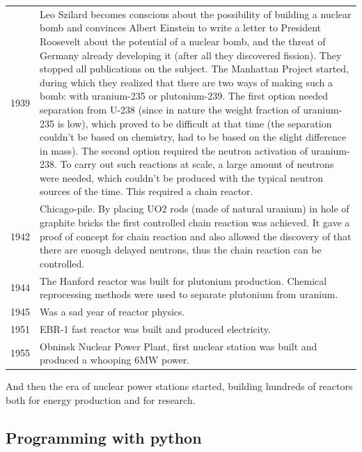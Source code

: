 \begin{tabularx}{\textwidth}{c | X}
1939 & Leo Szilard becomes conscious about the possibility of building a nuclear bomb and convinces Albert Einstein to write a letter to President Roosevelt about the potential of a nuclear bomb, and the threat of Germany already developing it (after all they discovered fission). They stopped all publications on the subject. The Manhattan Project started, during which they realized that there are two ways of making such a bomb: with uranium-235 or plutonium-239. The first option needed separation from U-238 (since in nature the weight fraction of uranium-235 is low), which proved to be difficult at that time (the separation couldn't be based on chemistry, had to be based on the slight difference in mass). The second option required the neutron activation of uranium-238. To carry out such reactions at scale, a large amount of neutrons were needed, which couldn't be produced with the typical neutron sources of the time. This required a chain reactor. \\
1942 & Chicago-pile. By placing UO2 rods (made of natural uranium) in hole of graphite bricks the first controlled chain reaction was achieved. It gave a proof of concept for chain reaction and also allowed the discovery of that there are enough delayed neutrons, thus the chain reaction can be controlled. \\
1944 & The Hanford reactor was built for plutonium production. Chemical reprocessing methods were used to separate plutonium from uranium. \\
1945 & Was a sad year of reactor physics. \\
1951 & EBR-1 fast reactor was built and produced electricity. \\
1955 & Obninsk Nuclear Power Plant, first nuclear station was built and produced a whooping 6MW power.
\end{tabularx}

And then the era of nuclear power stations started, building hundreds of reactors both for energy production and for research.


\subsection{Programming with python}

